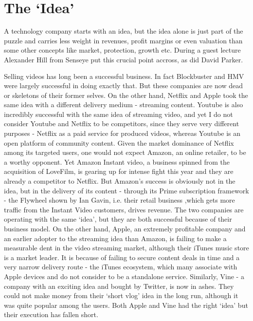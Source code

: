 \documentclass[twocolumn]{bmcart}%
\begin{document}

\section*{The `Idea'}
A technology company starts with an idea, but the idea alone is just part of the puzzle and carries less weight in revenues, profit margins or even valuation than some other concepts like market, protection, growth etc. During a guest lecture Alexander Hill from Senseye put this crucial point accross, as did David Parker.\\

\par Selling videos has long been a successful business. In fact Blockbuster and HMV were largely successful in doing exactly that. But these companies are now dead or skeletons of their former selves. On the other hand, Netflix and Apple took the same idea with a different delivery medium - streaming content. Youtube is also incredibly successful with the same idea of streaming video, and yet I do not consider Youtube and Netflix to be competitors, since they serve very different purposes - Netflix as a paid service for produced videos, whereas Youtube is an open platform of community content. Given the market dominance of Netflix among its targeted users, one would not expect Amazon, an online retailer, to be a worthy opponent. Yet Amazon Instant video, a business spinned from the acquisition of LoveFilm, is gearing up for intense fight this year and they are already a competitor to Netflix. But Amazon's success is obviously not in the idea, but in the delivery of its content - through its Prime subscription framework - the Flywheel shown by Ian Gavin, i.e. their retail business ,which gets more traffic from the Instant Video customers, drives revenue. The two companies are operating with the same `idea', but they are both successful because of their business model. On the other hand, Apple, an extremely profitable company and an earlier adopter to the streaming idea than Amazon, is failing to make a measurable dent in the video streaming market, although their iTunes music store is a market leader. It is because of failing to secure content deals in time and a very narrow delivery route - the iTunes ecosystem, which many associate with Apple devices and do not consider to be a standalone service. Similarly, Vine - a company with an exciting idea and bought by Twitter, is now in ashes. They could not make money from their `short vlog' idea in the long run, although it was quite popular among the users. Both Apple and Vine had the right `idea' but their execution has fallen short.\\
\end{document}
